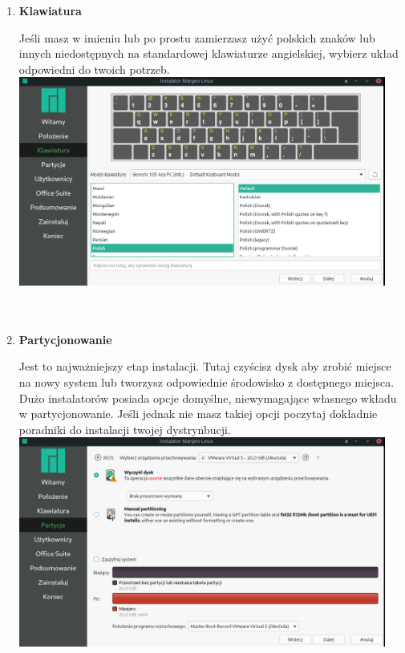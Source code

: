 \documentclass[10pt,a4paper]{article}
\begin{document}
\begin{enumerate}
\item \textbf{Klawiatura} \par
Jeśli masz w imieniu lub po prostu zamierzasz użyć polskich znaków lub innych niedostępnych na standardowej klawiaturze angielskiej, wybierz układ odpowiedni do twoich potrzeb.\\

\includegraphics[width=0.95\textwidth, center]{manjaro_install5.png}\\\\\\

\item \textbf{Partycjonowanie} \par
Jest to najważniejszy etap instalacji. Tutaj czyścisz dysk aby zrobić miejsce na nowy system lub tworzysz odpowiednie środowisko z dostępnego miejsca. Dużo instalatorów posiada opcje domyślne, niewymagające własnego wkładu w partycjonowanie. Jeśli jednak nie masz takiej opcji poczytaj dokładnie poradniki do instalacji twojej dystrynbucji.\\

\includegraphics[width=0.95\textwidth, center]{manjaro_install6.png}\\\\\\




\end{enumerate}
\end{document}
